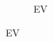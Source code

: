 \begin{frame}
\begin{figure}[h]
\begin{subfigure}{0.49\textwidth}
      \caption{EV}
   \end{subfigure}
\end{figure}

\end{frame}
